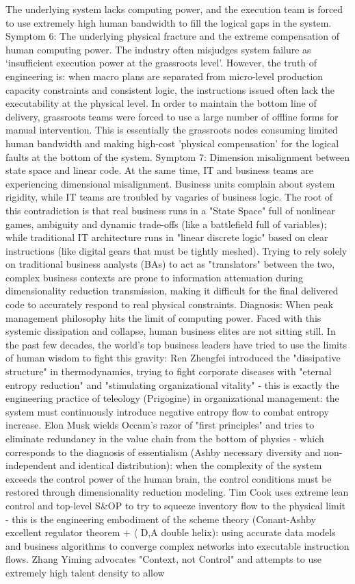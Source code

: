 \documentclass[11pt,a4paper]{article}
\begin{document}
The underlying system lacks computing power, and the execution team is forced to use extremely high human bandwidth to fill the logical gaps in the system. Symptom 6: The underlying physical fracture and the extreme compensation of human computing power. The industry often misjudges system failure as ‘insufficient execution power at the grassroots level’. However, the truth of engineering is: when macro plans are separated from micro-level production capacity constraints and consistent logic, the instructions issued often lack the executability at the physical level. In order to maintain the bottom line of delivery, grassroots teams were forced to use a large number of offline forms for manual intervention. This is essentially the grassroots nodes consuming limited human bandwidth and making high-cost 'physical compensation' for the logical faults at the bottom of the system. Symptom 7: Dimension misalignment between state space and linear code. At the same time, IT and business teams are experiencing dimensional misalignment. Business units complain about system rigidity, while IT teams are troubled by vagaries of business logic. The root of this contradiction is that real business runs in a "State Space" full of nonlinear games, ambiguity and dynamic trade-offs (like a battlefield full of variables); while traditional IT architecture runs in "linear discrete logic" based on clear instructions (like digital gears that must be tightly meshed). Trying to rely solely on traditional business analysts (BAs) to act as "translators" between the two, complex business contexts are prone to information attenuation during dimensionality reduction transmission, making it difficult for the final delivered code to accurately respond to real physical constraints. Diagnosis: When peak management philosophy hits the limit of computing power. Faced with this systemic dissipation and collapse, human business elites are not sitting still. In the past few decades, the world's top business leaders have tried to use the limits of human wisdom to fight this gravity: Ren Zhengfei introduced the "dissipative structure" in thermodynamics, trying to fight corporate diseases with "eternal entropy reduction" and "stimulating organizational vitality" - this is exactly the engineering practice of teleology (Prigogine) in organizational management: the system must continuously introduce negative entropy flow to combat entropy increase. Elon Musk wields Occam's razor of "first principles" and tries to eliminate redundancy in the value chain from the bottom of physics - which corresponds to the diagnosis of essentialism (Ashby necessary diversity and non-independent and identical distribution): when the complexity of the system exceeds the control power of the human brain, the control conditions must be restored through dimensionality reduction modeling. Tim Cook uses extreme lean control and top-level S\&OP to try to squeeze inventory flow to the physical limit - this is the engineering embodiment of the scheme theory (Conant-Ashby excellent regulator theorem + $\langle$ D,A  double helix): using accurate data models and business algorithms to converge complex networks into executable instruction flows. Zhang Yiming advocates "Context, not Control" and attempts to use extremely high talent density to allow 
\end{document}
